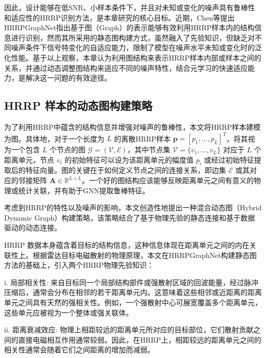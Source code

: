 因此，设计能够在低SNR、小样本条件下，并且对未知或变化的噪声具有鲁棒性和适应性的HRRP识别方法，是本章研究的核心目标。近期，Chen等提出HRRPGraphNet指出基于图（Graph）的表示能够有效利用HRRP样本内的结构信息进行识别，然而其所采用的静态图构建方式，虽然融入了先验知识，但缺乏对不同噪声条件下信号特变化的自适应能力，限制了模型在噪声水平未知或变化时的泛化性能。基于以上观察，本章认为利用图结构来表示HRRP样本内部或样本之间的关系，并通过动态调整图结构来适应不同的噪声特性，结合元学习的快速适应能力，是解决这一问题的有效途径。

\subsection{HRRP 样本的动态图构建策略}
\label{subsec:dynamic_graph_construction}

为了利用HRRP中蕴含的结构信息并增强对噪声的鲁棒性，本文将HRRP样本建模为图。具体地，对于一个长度为 $L$ 的离散HRRP样本 $\mathbf{p} = [p_1, \dots, p_L]^T$，将其视为一个包含 $L$ 个节点的图 $\mathcal{G} = (\mathcal{V}, \mathcal{E})$，其中节点集 $\mathcal{V} = \{v_1, \dots, v_L\}$ 对应于 $L$ 个距离单元，节点 $v_i$ 的初始特征可以设为该距离单元的幅度值 $p_i$ 或经过初始特征提取后的特征向量。图的关键在于如何定义节点之间的连接关系，即边集 $\mathcal{E}$ 或其对应的邻接矩阵 $\mathbf{A} \in \mathbb{R}^{L \times L}$。一个好的图结构应该能够反映距离单元之间有意义的物理或统计关联，并有助于GNN提取鲁棒特征。

考虑到HRRP的特性以及噪声的影响，本文创造性地提出一种混合动态图（Hybrid Dynamic Graph）构建策略，该策略结合了基于物理先验的静态连接和基于数据驱动的动态连接。

HRRP 数据本身蕴含着目标的结构信息，这种信息体现在距离单元之间的内在关联性上。根据雷达目标电磁散射的物理原理，本文在HRRPGraphNet构建静态图方法的基础上，引入两个HRRP物理先验知识：

i.  局部相关性: 来自目标同一个局部结构部件或强散射区域的回波能量，经过脉冲压缩后，通常会分布在相邻的若干距离单元内。这意味着这些相邻或近距离的距离单元之间具有天然的强相关性。例如，一个强散射中心可展宽覆盖多个距离单元，这些单元应被视为一个整体或强关联体。

ii.  距离衰减效应: 物理上相距较远的距离单元所对应的目标部位，它们散射贡献之间的直接电磁相互作用通常较弱。因此，在HRRP上，相距较远的距离单元之间的相关性通常会随着它们之间距离的增加而减弱。

